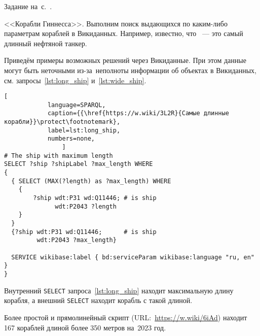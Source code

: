 \hfil{}\hfil%
\newpage

\begin{task}
    \label{answer:ship_Guinness}
    \AnswerBackref Задание на~с.~\pageref{question:ship_Guinness}.

    <<Корабли Гиннесса>>. 
    Выполним поиск выдающихся по каким-либо параметрам кораблей в Викиданных.
    Например, известно, что ~--- это самый длинный нефтяной танкер.

    Приведём примеры возможных решений через Викиданные. 
    При этом данные могут быть неточными из-за~неполноты информации об объектах в Викиданных, 
    см. запросы~\ref{lst:long_ship} и~\ref{lst:wide_ship}.

\begin{lstlisting}[ 
            language=SPARQL, 
            caption={{\href{https://w.wiki/3L2R}{Самые длинные корабли}}\protect\footnotemark}, 
            label=lst:long_ship,
            numbers=none,
                ]
# The ship with maximum length
SELECT ?ship ?shipLabel ?max_length WHERE 
{
  { SELECT (MAX(?length) as ?max_length) WHERE
    {
        ?ship wdt:P31 wd:Q11446; # is ship
              wdt:P2043 ?length
    }
  }
  {?ship wdt:P31 wd:Q11446;      # is ship
         wdt:P2043 ?max_length}
		
  SERVICE wikibase:label { bd:serviceParam wikibase:language "ru, en" }
}
\end{lstlisting}

Внутренний \lstinline|SELECT| запроса~\ref{lst:long_ship} находит максимальную длину корабля, 
а внешний \lstinline|SELECT| находит корабль с такой длиной. 

Более простой и прямолинейный скрипт (URL:~\href{https://w.wiki/6iAd}{https://w.wiki/6iAd}) 
находит 167 кораблей длиной более 350 метров на~2023 год. 





\end{task}
